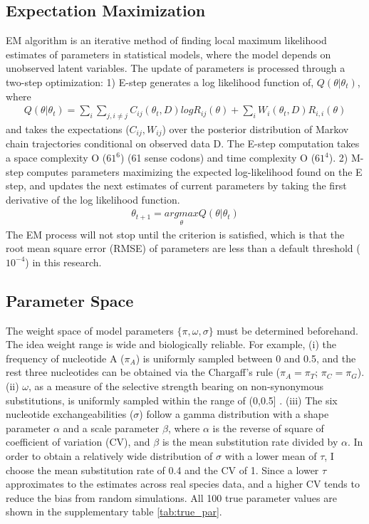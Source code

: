 \subsection{Expectation Maximization}
EM algorithm is an iterative method of finding local maximum likelihood estimates of parameters in statistical models, where the model depends on unobserved latent variables. The update of parameters is processed through a two-step optimization: 1) E-step generates a log likelihood function of, $Q(\theta|\theta_{t})$, where 
\begin{gather*}
           Q(\theta|\theta_{t}) = \sum_{i}\sum_{j,i\neq j}C_{ij}(\theta_t,D)log R_{ij}(\theta) + \sum_{i}W_{i}(\theta_t,D)R_{i,i}(\theta)
\end{gather*}
and takes the expectations ($C_{ij}, W_{ij}$) over the posterior distribution of Markov chain trajectories conditional on observed data D. The E-step computation takes a space complexity O ($61^6$) (61 sense codons) and time complexity O ($61^4$). 2) M-step computes parameters maximizing the expected log-likelihood found on the E step, and updates the next estimates of current parameters by taking the first derivative of the log likelihood function. 
\begin{gather*}
              \theta_{t+1} = \underset{\theta}{argmax}Q(\theta |\theta_{t})
\end{gather*}
The EM process will not stop until the criterion is satisfied, which is that the root mean square error (RMSE) of parameters are less than a default threshold ($10^{-4}$) in this research. 

\subsection{Parameter Space}
The weight space of model parameters $\{\pi, \omega, \sigma \}$ must be determined beforehand. The idea weight range is wide and biologically reliable. For example, (i) the frequency of nucleotide A ($\pi_A$) is uniformly sampled between 0 and 0.5, and the rest three nucleotides can be obtained via the Chargaff’s rule ($\pi_A=\pi_T$; $\pi_C=\pi_G$). (ii) $\omega$, as a measure of the selective strength bearing on non-synonymous substitutions, is uniformly sampled within the range of (0,0.5] \parencite{zou2021nonsynonymous}. (iii) The six nucleotide exchangeabilities ($\sigma$) follow a gamma distribution with a shape parameter $\alpha$ and a scale parameter $\beta$, where $\alpha$ is the reverse of square of coefficient of variation (CV), and $\beta$ is the mean substitution rate divided by $\alpha$. In order to obtain a relatively wide distribution of $\sigma$ with a lower mean of $\tau$, I choose the mean substitution rate of 0.4 and the CV of 1. Since a lower $\tau$ approximates to the estimates across real species data, and a higher CV tends to reduce the bias from random simulations. All 100 true parameter values are shown in the supplementary table \ref{tab:true_par}.  

